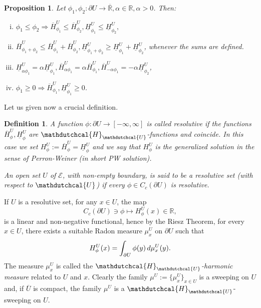 \documentclass{amsart}
\newtheorem{prop}[thm]{Proposition}
\newtheorem{defn}[thm]{Definition}
\numberwithin{equation}{section}
\def \p{{\phi}}
\def \r{{\mathbb{R}}}
\def \Hd{{\mathdutchcal{H}}}
\def \Ec{{\mathcal{E}}}
\def \Ud{{\mathdutchcal{U}}}
\begin{document}
{\begin{prop} %
Let $\p_1, \p_2 : \partial U \rightarrow \overline{\mathbb{R}}, \alpha \in \mathbb{R}, \alpha >0$. Then:
	\begin{enumerate}[(i)]
		\item $\p_1 \leq \p_2 \Rightarrow \overline{H}^U_{\p_1} \leq \overline{H}^U_{\p_2}, \underline{H}^U_{\p_1} \leq \underline{H}^U_{\p_2} ,$
		\item $\overline{H}^U_{\p_1 +\p_2} \leq \overline{H}^U_{\p_1} + \overline{H}^U_{\p_2}, \underline{H}^U_{\p_1 +\p_2} \geq \underline{H}^U_{\p_1} + \underline{H}^U_{\p_2}  $, whenever the sums are defined.
		\item $\underline{H}^U_{\alpha \p_1} = \alpha \underline{H}^U_{\p_1}, \overline{H}^U_{\alpha \p_1} = \alpha \overline{H}^U_{\p_1}, \overline{H}^U_{-\alpha \p_1} = -\alpha \underline{H}^U_{\p_2}$,
		\item $\p_1 \geq 0 \Rightarrow  \overline{H}^U_{\p_1} , \underline{H}^U_{\p_1} \geq 0$.
	\end{enumerate}
\end{prop}
Let us given now a crucial definition.
\begin{defn}
	 A function $\p: \partial U \rightarrow [-\infty, \infty]$ is called \textup{resolutive} if the functions $\overline{H}^U_\p, \underline{H}^U_\p$ are $\Hd_{\Ud}$-functions and coincide. In this case we set $H^U_\p := \overline{H}^U_\p =\underline{H}^U_\p$ and we say that $H^U_\p$ is the \textup{generalized solution in the sense of Perron-Weiner} (in short PW solution).
	 
	  An open set $U$ of $\Ec$, with non-empty boundary, is said to be a \textup{resolutive set} (with respect to $\Ud$) if every $\p \in {C}_c(\partial U)$ is resolutive.
\end{defn}If $U$ is a resolutive set, for any $x \in U$, the map
$$
{C}_c(\partial U) \ni \p \longmapsto H_{\p}^U (x) \in \r,
$$
is a linear and non-negative functional, hence by the Riesz Theorem, for every $x \in U$, there exists a suitable Radon measure $\mu^U_x$ on $\partial U$ such that
$$
H^U_\p(x)=\int_{\partial U} \p(y) \, {\rm d}\mu^U_x(y).
$$
The measure $ \mu_x ^U $ is called the $\Hd_{\Ud}$\textit{-harmonic measure} related to $U$ and $x$. Clearly the family $\mu^U := \{\mu^U_x\}_{x \in U}$ is a sweeping on $U$ and, if $\overline{U}$ is compact, the family $\mu^U$ is a $\Hd_{\Ud}$-sweeping on $U$.


}
\end{document}
